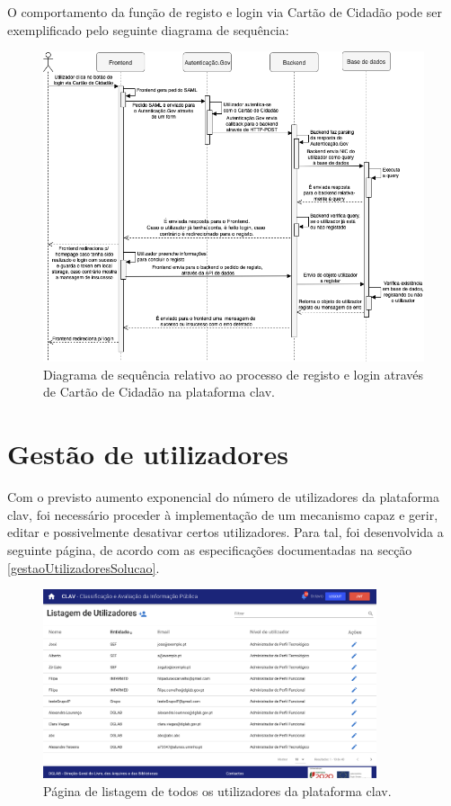 O comportamento da função de registo e login via Cartão de Cidadão pode ser exemplificado pelo seguinte diagrama de sequência:

\vspace{5mm}
\begin{figure}[H]
    \centering
    \includegraphics[width=\textwidth]{img/diagramas/sequencia/DiagramasSequencia-LoginCC.png}
    \caption{Diagrama de sequência relativo ao processo de registo e login através de Cartão de Cidadão na plataforma \gls{clav}.}
    \label{fig:diagramaSequenciaCC}
\end{figure}

\cleardoublepage
\section{Gestão de utilizadores}

Com o previsto aumento exponencial do número de utilizadores da plataforma \gls{clav}, foi necessário proceder à implementação de um mecanismo capaz e gerir, editar e possivelmente desativar certos utilizadores. Para tal, foi desenvolvida a seguinte página, de acordo com as especificações documentadas na secção \ref{gestaoUtilizadoresSolucao}.
\vspace{-3mm}
\begin{figure}[H]
    \centering
    \includegraphics[width=0.875\textwidth]{img/clav/gestao/listagem.png}
    \caption{Página de listagem de todos os utilizadores da plataforma \gls{clav}.}
    \label{fig:pagListagemUtilizadores}
\end{figure}

